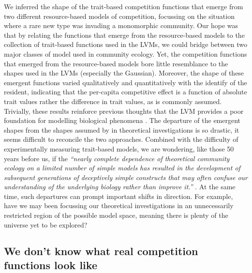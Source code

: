 \documentclass[a4paper,11pt]{article}
\begin{document}
We inferred the shape of the trait-based competition functions that
emerge from two different resource-based models of competition,
focussing on the situation where a rare new type was invading a
monomorphic community. Our hope was that by relating the functions
that emerge from the resource-based models to the collection of
trait-based functions used in the LVMs, we could bridge between two
major classes of model used in community ecology. Yet, the competition
functions that emerged from the resource-based models bore little
resemblance to the shapes used in the LVMs (especially the
Gaussian). Moreover, the shape of these emergent functions varied
qualitatively and quantitatively with the identify of the resident,
indicating that the per-capita competitive effect is a function of
absolute trait values rather the difference in trait values, as is
commonly assumed. Trivially, these results reinforce previous thoughts
that the LVM provides a poor foundation for modelling biological
phenomena \citep[e.g.]{Andrewartha-1953,  Neill-1974, Abrams-1975,
  Wangersky-1978, Abrams-1980, Tilman-1987, Abrams-2008}. The departure of the emergent shapes from the shapes assumed by in theoretical investigations is so drastic, it seems difficult to reconcile the two approaches. Combined with the difficulty of experimentally measuring trait-based models, we are wondering, like those 50 years before us, if the  \emph{``nearly complete dependence of theoretical community ecology on a limited number of simple models has resulted in the development of subsequent generations of deceptively simple constructs that may often confuse our understanding of the underlying biology rather than improve it.''}  \citep{Neill-1974}. At the same time, such departures can prompt important shifts in direction. For example, have we may been focussing our theoretical investigations in an unnecessarily restricted region of the possible model space, meaning there is plenty of the universe yet to be explored?

\subsection{We don't know what real competition functions look like}
\end{document}
